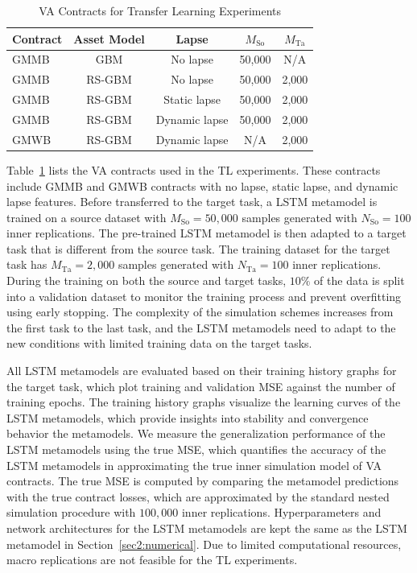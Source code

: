 \begin{table}[ht!] 
    \centering
    \begin{tabular}{lcccc} 
    \toprule
    \textbf{Contract} & \textbf{Asset Model} & \textbf{Lapse} & \textbf{$M_{\text{So}}$}  & \textbf{$M_{\text{Ta}}$}\\
    \midrule
    GMMB & GBM & No lapse & 50,000 & N/A \\
    GMMB & RS-GBM & No lapse & 50,000 & 2,000 \\
    GMMB & RS-GBM & Static lapse & 50,000 & 2,000 \\
    GMMB & RS-GBM & Dynamic lapse & 50,000 & 2,000 \\
    GMWB & RS-GBM & Dynamic lapse & N/A & 2,000 \\
    \bottomrule
    \end{tabular}
    \caption{VA Contracts for Transfer Learning Experiments}
    \label{tab3:contracts}
\end{table}

Table~\ref{tab3:contracts} lists the VA contracts used in the TL experiments.
These contracts include GMMB and GMWB contracts with no lapse, static lapse, and dynamic lapse features.
Before transferred to the target task, a LSTM metamodel is trained on a source dataset with $M_{\text{So}} = 50,\!000$ samples generated with $N_{\text{So}} = 100$ inner replications\footnotemark.
The pre-trained LSTM metamodel is then adapted to a target task that is different from the source task.
The training dataset for the target task has $M_{\text{Ta}} = 2,\!000$ samples generated with $N_{\text{Ta}} = 100$ inner replications.
During the training on both the source and target tasks, $10\%$ of the data is split into a validation dataset to monitor the training process and prevent overfitting using early stopping.
The complexity of the simulation schemes increases from the first task to the last task, and the LSTM metamodels need to adapt to the new conditions with limited training data on the target tasks.

All LSTM metamodels are evaluated based on their training history graphs for the target task, which plot training and validation MSE against the number of training epochs.
The training history graphs visualize the learning curves of the LSTM metamodels, which provide insights into stability and convergence behavior the metamodels.
We measure the generalization performance of the LSTM metamodels using the true MSE, which quantifies the accuracy of the LSTM metamodels in approximating the true inner simulation model of VA contracts.
The true MSE is computed by comparing the metamodel predictions with the true contract losses, which are approximated by the standard nested simulation procedure with $100,\!000$ inner replications.
Hyperparameters and network architectures for the LSTM metamodels are kept the same as the LSTM metamodel in Section~\ref{sec2:numerical}. 
Due to limited computational resources, macro replications are not feasible for the TL experiments.

